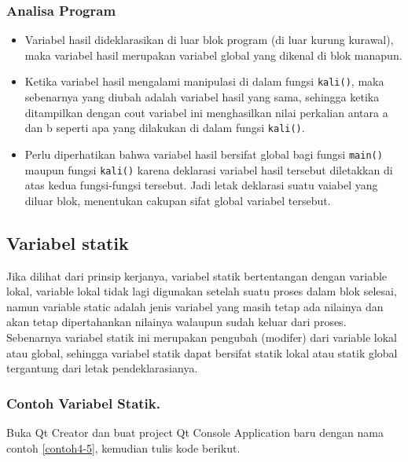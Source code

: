 \subsubsection*{Analisa Program}

\begin{itemize}

\item
  Variabel hasil dideklarasikan di luar blok program (di luar kurung
  kurawal), maka variabel hasil merupakan variabel global yang dikenal
  di blok manapun.
\item
  Ketika variabel hasil mengalami manipulasi di dalam fungsi
  \texttt{kali()}, maka sebenarnya yang diubah adalah variabel hasil
  yang sama, sehingga ketika ditampilkan dengan cout variabel ini
  menghasilkan nilai perkalian antara a dan b seperti apa yang dilakukan
  di dalam fungsi \texttt{kali()}.
\item
  Perlu diperhatikan bahwa variabel hasil bersifat global bagi fungsi
  \texttt{main()} maupun fungsi \texttt{kali()} karena deklarasi
  variabel hasil tersebut diletakkan di atas kedua fungsi-fungsi
  tersebut. Jadi letak deklarasi suatu vaiabel yang diluar blok,
  menentukan cakupan sifat global variabel tersebut.
\end{itemize}

\subsection{ Variabel statik}\label{variabel-statik}

Jika dilihat dari prinsip kerjanya, variabel statik bertentangan dengan
variable lokal, variable lokal tidak lagi digunakan setelah suatu proses
dalam blok selesai, namun variable static adalah jenis variabel yang
masih tetap ada nilainya dan akan tetap dipertahankan nilainya walaupun
sudah keluar dari proses. Sebenarnya variabel statik ini merupakan
pengubah (modifer) dari variable lokal atau global, sehingga variabel
statik dapat bersifat statik lokal atau statik global tergantung dari
letak pendeklarasianya.

\subsubsection*{Contoh  Variabel Statik.}

Buka Qt Creator dan buat project Qt Console Application baru dengan nama
contoh \ref{contoh4-5}, kemudian tulis kode berikut.



